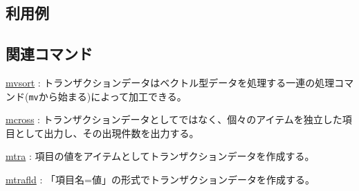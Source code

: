 \subsection*{利用例}

\subsection*{関連コマンド}
\hyperref[sect:mvsort] {mvsort} : トランザクションデータはベクトル型データを処理する一連の処理コマンド(\verb|mv|から始まる)によって加工できる。

\hyperref[sect:mcross] {mcross} : トランザクションデータとしてではなく、個々のアイテムを独立した項目として出力し、その出現件数を出力する。

\hyperref[sect:mtra] {mtra} : 項目の値をアイテムとしてトランザクションデータを作成する。

\hyperref[sect:mtrafld] {mtrafld} : 「項目名=値」の形式でトランザクションデータを作成する。

%
